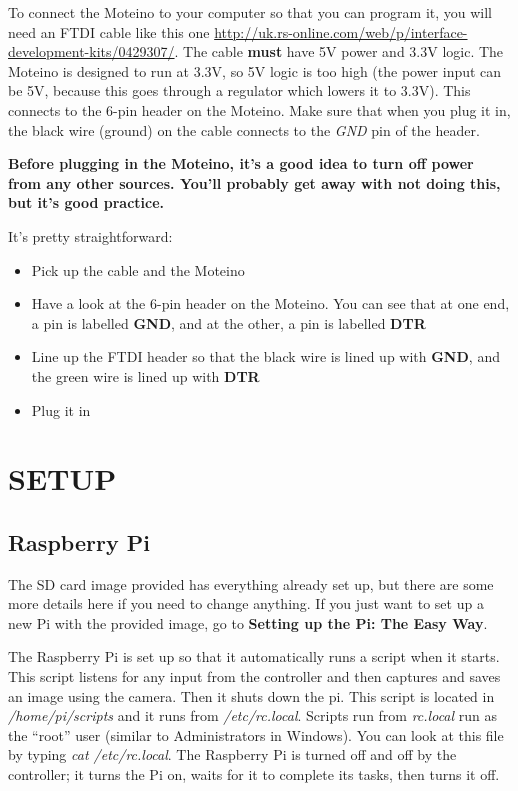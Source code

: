 \documentclass[10pt]{article}
\begin{document}
To connect the Moteino to your computer so that you can program it, you will need an FTDI cable like this one
\url{http://uk.rs-online.com/web/p/interface-development-kits/0429307/}. The cable \textbf{must} have 5V power and 3.3V logic. The Moteino is designed to run at 3.3V,
so 5V logic is too high (the power input can be 5V, because this goes through a regulator which lowers it to 3.3V). This connects to the 6-pin header on the Moteino. Make
sure that when you plug it in, the black wire (ground) on the cable connects to the \textit{GND} pin of the header. \newline

\textbf{Before plugging in the Moteino, it's a good idea to turn off power from any other sources. You'll probably get away with not doing this, but it's good practice.} \newline

It's pretty straightforward:

\begin{itemize}
 \item Pick up the cable and the Moteino
 \item Have a look at the 6-pin header on the Moteino. You can see that at one end, a pin is labelled \textbf{GND}, and at the other, a pin is labelled \textbf{DTR}
 \item Line up the FTDI header so that the black wire is lined up with \textbf{GND}, and the green wire is lined up with \textbf{DTR}
 \item Plug it in
\end{itemize}

\section{SETUP}

\subsection{Raspberry Pi}
The SD card image provided has everything already set up, but there are some more details here if you need to change anything. If you just want to set up a new Pi with the
provided image, go to \textbf{Setting up the Pi: The Easy Way}.

The Raspberry Pi is set up so that it automatically runs a script when it starts. This script listens for any input from the controller and then captures and saves an image
using the camera. Then it shuts down the pi. This script is located in \textit{/home/pi/scripts} and it runs from \textit{/etc/rc.local}. Scripts run from \textit{rc.local}
run as the ``root'' user (similar to Administrators in Windows). You can look at this file by typing \textit{cat /etc/rc.local}. The Raspberry Pi is turned off and off
by the controller; it turns the Pi on, waits for it to complete its tasks, then turns it off.
\end{document}
